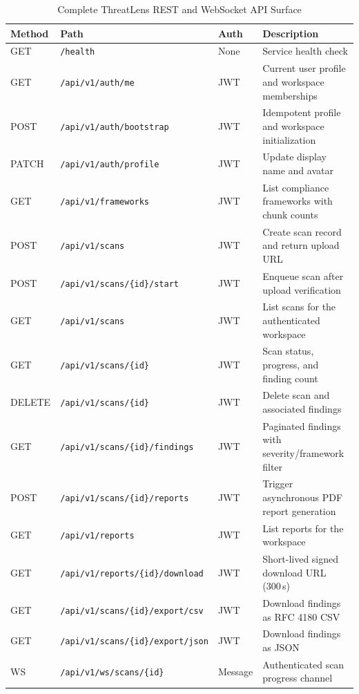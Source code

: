 \documentclass[conference]{IEEEtran}
\newcommand{\tsz}{\footnotesize}
\begin{document}
\begin{table}[!t]
\caption{Complete ThreatLens REST and WebSocket API Surface}
\label{tab:fullapi}
\centering\tsz
\renewcommand{\arraystretch}{1.05}
\begin{tabularx}{\textwidth}{@{}lllX@{}}
\toprule
\textbf{Method} & \textbf{Path} & \textbf{Auth} & \textbf{Description}\\
\midrule
GET    & \texttt{/health} & None & Service health check\\
GET    & \texttt{/api/v1/auth/me} & JWT & Current user profile and workspace memberships\\
POST   & \texttt{/api/v1/auth/bootstrap} & JWT & Idempotent profile and workspace initialization\\
PATCH  & \texttt{/api/v1/auth/profile} & JWT & Update display name and avatar\\
GET    & \texttt{/api/v1/frameworks} & JWT & List compliance frameworks with chunk counts\\
POST   & \texttt{/api/v1/scans} & JWT & Create scan record and return upload URL\\
POST   & \texttt{/api/v1/scans/\{id\}/start} & JWT & Enqueue scan after upload verification\\
GET    & \texttt{/api/v1/scans} & JWT & List scans for the authenticated workspace\\
GET    & \texttt{/api/v1/scans/\{id\}} & JWT & Scan status, progress, and finding count\\
DELETE & \texttt{/api/v1/scans/\{id\}} & JWT & Delete scan and associated findings\\
GET    & \texttt{/api/v1/scans/\{id\}/findings} & JWT & Paginated findings with severity/framework filter\\
POST   & \texttt{/api/v1/scans/\{id\}/reports} & JWT & Trigger asynchronous PDF report generation\\
GET    & \texttt{/api/v1/reports} & JWT & List reports for the workspace\\
GET    & \texttt{/api/v1/reports/\{id\}/download} & JWT & Short-lived signed download URL (300\,s)\\
GET    & \texttt{/api/v1/scans/\{id\}/export/csv} & JWT & Download findings as RFC 4180 CSV\\
GET    & \texttt{/api/v1/scans/\{id\}/export/json} & JWT & Download findings as JSON\\
WS     & \texttt{/api/v1/ws/scans/\{id\}} & Message & Authenticated scan progress channel\\
\bottomrule
\end{tabularx}
\end{table}
\end{document}
